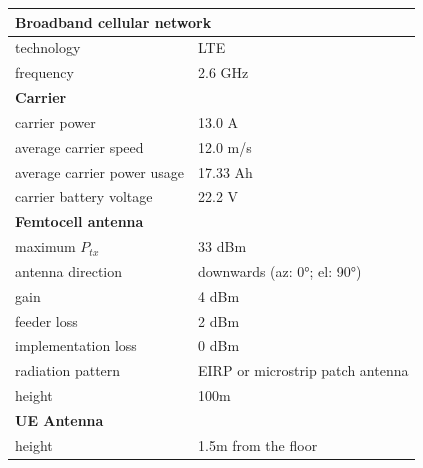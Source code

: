 \begin{table}[!htb]
\centering
\begin{tabular}[t]{ll}
        \toprule
        \multicolumn{2}{l}{\textbf{Broadband cellular network}} \\
        \hline
        \hspace{3mm}  technology        & LTE     \\
        \hspace{3mm}  frequency         & 2.6 GHz \\
        \hline
        \multicolumn{2}{l}{\textbf{Carrier}} \\
        \hline  
        \hspace{3mm}  carrier power        & 13.0 A   \\
        \hspace{3mm}  average carrier speed        & 12.0 m/s \\
        \hspace{3mm}  average carrier power usage      & 17.33 Ah    \\
        \hspace{3mm}  carrier battery voltage       & 22.2 V \\
        \hline
        \multicolumn{2}{l}{\textbf{Femtocell antenna}} \\
        \hline  
        \hspace{3mm}  maximum $P_{tx}$          & 33 dBm   \\
        \hspace{3mm}  antenna  direction        & downwards (az: \ang{0}; el: \ang{90})    \\ 
        \hspace{3mm}  gain                      & 4 dBm   \\ 
        \hspace{3mm}  feeder loss               & 2 dBm   \\ 
        \hspace{3mm}  implementation loss       & 0 dBm   \\
        \hspace{3mm}  radiation pattern         & \acs{EIRP} or microstrip patch antenna\\
        \hspace{3mm}  height                    & 100m  \\
        \hline
        \multicolumn{2}{l}{\textbf{\acs{UE} Antenna}} \\
        \hline 
        \hspace{3mm} height                     & 1.5m from the floor       \\ 

\end{tabular}
\end{table}
